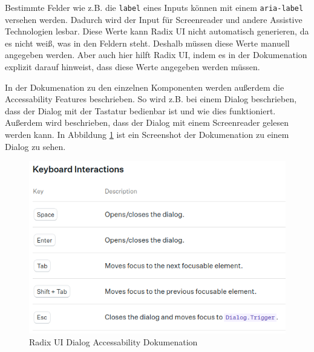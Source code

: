 Bestimmte Felder wie z.B. die \texttt{label} eines Inputs können mit einem \texttt{aria-label} versehen werden. Dadurch wird der Input für Screenreader und andere Assistive Technologien lesbar. Diese Werte kann Radix UI nicht automatisch generieren, da es nicht weiß, was in den Feldern steht. Deshalb müssen diese Werte manuell angegeben werden. Aber auch hier hilft Radix UI, indem es in der Dokumenation explizit darauf hinweist, dass diese Werte angegeben werden müssen.

In der Dokumenation zu den einzelnen Komponenten werden außerdem die Accessability Features beschrieben. So wird z.B. bei einem Dialog beschrieben, dass der Dialog mit der Tastatur bedienbar ist und wie dies funktioniert. Außerdem wird beschrieben, dass der Dialog mit einem Screenreader gelesen werden kann. In Abbildung \ref{fig:radix_dialog_keyboard} ist ein Screenshot der Dokumenation zu einem Dialog zu sehen.

\begin{figure}[th]
\centering
\includegraphics[width=\textwidth]{Figures/radix_dialog_keyboard.png}
\decoRule
\caption[Dialog Accessability Dokumenation]{Radix UI Dialog Accessability Dokumenation}
\label{fig:radix_dialog_keyboard}
\end{figure}

